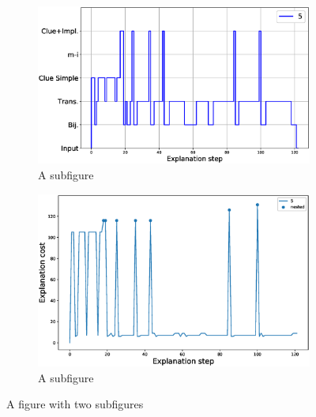\begin{figure}
\centering
\begin{subfigure}{.5\textwidth}
\centering
\includegraphics[width=0.98\linewidth]{figures/plot_cost_steps_5.eps}
\caption{A subfigure}
\label{fig:sub1}
\end{subfigure}%
\begin{subfigure}{.5\textwidth}
\centering
\includegraphics[width=0.9\linewidth]{figures/5.eps}
\caption{A subfigure}
\label{fig:sub2}
\end{subfigure}
\caption{A figure with two subfigures}
\label{fig:test}
\end{figure}

